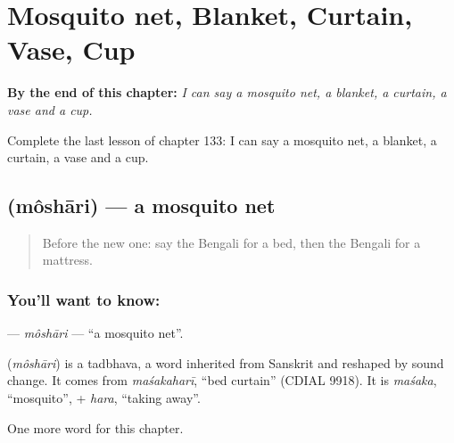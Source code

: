 
\chapter{Mosquito net, Blanket, Curtain, Vase, Cup}
\label{ch:bn-mosquito-net-blanket-curtain-vase-cup}

\begin{chapteropening}
\textbf{By the end of this chapter:} \emph{I can say a mosquito net, a blanket, a curtain, a vase and a cup.}

Complete the last lesson of chapter 133: I can say a mosquito net, a blanket, a curtain, a vase and a cup.
\end{chapteropening}

\section[\texorpdfstring{\bn{মশারি} (môshāri)}{মশারি (môshāri)}]{ (môshāri) — a mosquito net}

\label{lesson:BN-C133-moshari}



\begin{quote}
Before the new one: say the Bengali for a bed, then the Bengali for a mattress.
\end{quote}

\subsection*{You'll want to know: }
\textbf{} — \emph{môshāri} — \textquotedblleft{}a mosquito net\textquotedblright{}.

\begin{cousinweb}
\textbf{} (\emph{môshāri}) is a tadbhava, a word inherited from Sanskrit and reshaped by sound change. It comes from \emph{maśakaharī}, \textquotedblleft{}bed curtain\textquotedblright{} (CDIAL 9918). It is \emph{maśaka}, \textquotedblleft{}mosquito\textquotedblright{}, + \emph{hara}, \textquotedblleft{}taking away\textquotedblright{}.
\end{cousinweb}

\begin{grammarlens}[title={What you've built}]
One more word for this chapter.
\end{grammarlens}


